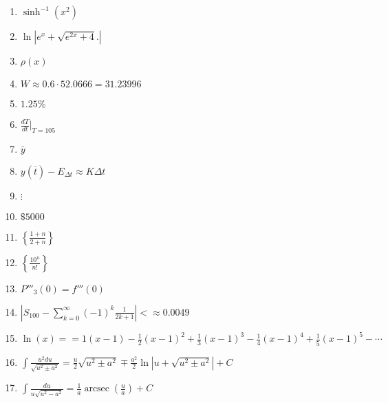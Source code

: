 \documentclass[oneside,10pt,]{article}
\newcommand{\dollar}{\$}
\DeclareMathOperator{\arcsec}{arcsec}
\newcommand{\lt}{<}
\begin{document}
\begin{enumerate}
\item{}\(\sinh^{-1}(x^2)\)%
\item{}\(\ln|e^x + \sqrt{e^{2x} + 4}.|\)%
\item{}\(\rho(x)\)%
\item{}\(W \approx 0.6 \cdot 52.0666 = 31.23996\)%
\item{}\(1.25\%\)%
\item{}\(\frac{dT}{dt}\vert_{T=105}\)%
\item{}\(\bar{y}\)%
\item{}\(y(\overline{t}) - E_{\Delta t} \approx K\Delta t\)%
\item{}\(\vdots\)%
\item{}\(\dollar5000\)%
\item{}\(\left\{ \frac{1+n}{2+n}\right\}\)%
\item{}\(\left\{\frac{10^n}{n!}\right\}\)%
\item{}\(P'''_3(0) = f'''(0)\)%
\item{}\(|S_{100} - \sum_{k=0}^{\infty} (-1)^{k} \frac{1}{2k+1}| \lt \approx 0.0049\)%
\item{}\(\ln(x) = = 1(x-1) - \frac{1}{2}(x-1)^2 + \frac{1}{3}(x-1)^3 - \frac{1}{4}(x-1)^4 + \frac{1}{5}(x-1)^5 - \cdots\)%
\item{}\(\displaystyle \int \frac{u^2 du}{\sqrt{u^2 \pm a^2}} = \frac{u}{2}\sqrt{u^2 \pm a^2} \mp \frac{a^2}{2}\ln|u + \sqrt{u^2 \pm a^2}| + C\)%
\item{}\(\displaystyle \int \frac{du}{u\sqrt{u^2-a^2}} = \frac{1}{a} \arcsec \left( \frac{u}{a} \right) + C\)%
\end{enumerate}
%
\end{document}
